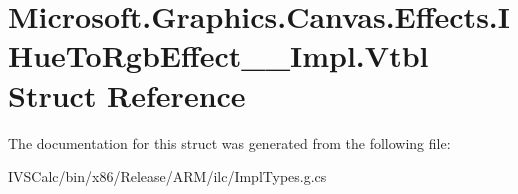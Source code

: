 \hypertarget{struct_microsoft_1_1_graphics_1_1_canvas_1_1_effects_1_1_i_hue_to_rgb_effect_____impl_1_1_vtbl}{}\section{Microsoft.\+Graphics.\+Canvas.\+Effects.\+I\+Hue\+To\+Rgb\+Effect\+\_\+\+\_\+\+Impl.\+Vtbl Struct Reference}
\label{struct_microsoft_1_1_graphics_1_1_canvas_1_1_effects_1_1_i_hue_to_rgb_effect_____impl_1_1_vtbl}


The documentation for this struct was generated from the following file\+:\begin{DoxyCompactItemize}
\item 
I\+V\+S\+Calc/bin/x86/\+Release/\+A\+R\+M/ilc/Impl\+Types.\+g.\+cs\end{DoxyCompactItemize}
